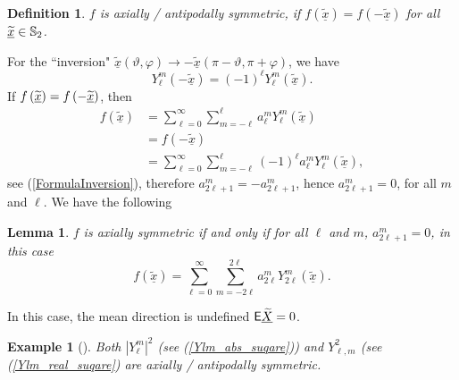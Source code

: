 \documentclass[preprint,11pt,a4paper]{elsarticle}
\newtheorem{definition}[theorem]{Definition}
\newtheorem{example}[theorem]{Example}
\newtheorem{lemma}[theorem]{Lemma}
\begin{document}
\begin{definition}
$f$ is axially / antipodally symmetric, if $f\left( \underline{\widetilde{x}}%
\right) =f\left( -\underline{\widetilde{x}}\right) $ for all $\underline{%
\widetilde{x}}\in\mathbb{S}_{2}$.
\end{definition}

For the \textquotedblleft inversion" $\underline{\widetilde{x}}\left(
\vartheta,\varphi\right) \rightarrow-\underline{\widetilde{x}}\left(
\pi-\vartheta,\pi+\varphi\right) $, we have 
\begin{equation}
Y_{\ell}^{m}\left( -\underline{\widetilde{x}}\right) =\left( -1\right)
^{\ell}Y_{\ell}^{m}\left( \underline{\widetilde{x}}\right) .
\label{FormulaInversion}
\end{equation}
If $f\left( \underline{\widetilde{x}}\right) =f\left( -\underline{\widetilde{%
x}}\right) $, then 
\begin{align*}
f\left( \underline{\widetilde{x}}\right) &
=\sum_{\ell=0}^{\infty}\sum_{m=-\ell}^{\ell}a_{\ell}^{m}Y_{\ell}^{m}\left( 
\underline{\widetilde{x}}\right) \\
& =f\left( -\underline{\widetilde{x}}\right) \\
& =\sum_{\ell=0}^{\infty}\sum_{m=-\ell}^{\ell}\left( -1\right) ^{\ell
}a_{\ell}^{m}Y_{\ell}^{m}\left( \underline{\widetilde{x}}\right) ,
\end{align*}
see (\ref{FormulaInversion}), therefore $a_{2\ell+1}^{m}=-a_{2\ell+1}^{m}$,
hence $a_{2\ell+1}^{m}=0$, for all $m$ and $\ell$. We have the following

\begin{lemma}
$f$ is axially symmetric if and only if for all $\ell$ and $m$, $a_{2\ell
+1}^{m}=0$, in this case 
\begin{equation*}
f\left( \underline{\widetilde{x}}\right)
=\sum_{\ell=0}^{\infty}\sum_{m=-2\ell}^{2\ell}a_{2\ell}^{m}Y_{2\ell}^{m}%
\left( \underline{\widetilde{x}}\right) .
\end{equation*}
\end{lemma}

In this case, the mean direction is undefined $\mathsf{E}\underline{%
\widetilde{X}}=0$.

\begin{example}[\textbf{Ex. \protect\ref{EX_Ylm_compl_suqare}, \protect\ref%
{EX_Ylm_real_suqare} contd.}]
Both $\left\vert Y_{\ell}^{m}\right\vert ^{2}$ (see (\ref{Ylm_abs_suqare}))
and $Y_{\ell,m}^{2}$ (see (\ref{Ylm_real_suqare}) are axially / antipodally
symmetric.
\end{example}
\end{document}
